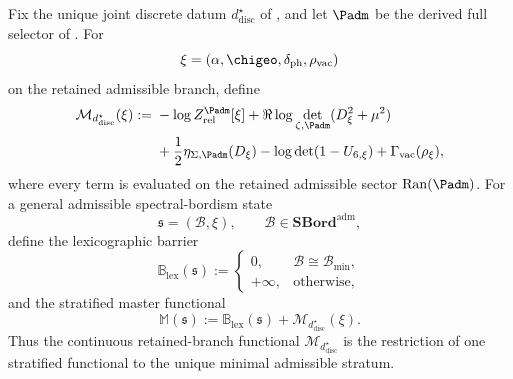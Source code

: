 \begin{definition}
\label{def:projected-modular-free-energy}
Fix the unique joint discrete datum $d^\star_{\mathrm{disc}}$ of
, and let $\Padm$ be the derived full selector of
. For
\[
\xi=(\alpha,\chigeo,\delta_{\mathrm{ph}},\rho_{\mathrm{vac}})
\]
on the retained admissible branch, define
\[
\begin{aligned}
\mathcal M_{d^\star_{\mathrm{disc}}}(\xi)
:={}&-\log Z^{\Padm}_{\mathrm{rel}}[\xi]
+\Re\log\det_{\zeta,\Padm}(D_\xi^2+\mu^2)\\
&+\frac12\eta_{\Sigma,\Padm}(D_\xi)
-\log\det(1-U_{6,\xi})
+\Gamma_{\mathrm{vac}}(\rho_\xi),
\end{aligned}
\]
where every term is evaluated on the retained admissible sector $\operatorname{Ran}(\Padm)$.
For a general admissible spectral-bordism state
\[
\mathfrak s=(\mathcal B,\xi),
\qquad
\mathcal B\in\mathbf{SBord}^{\mathrm{adm}},
\]
define the lexicographic barrier
\[
\mathbb B_{\mathrm{lex}}(\mathfrak s)
:=
\begin{cases}
0,& \mathcal B\cong \mathcal B_{\min},\\
+\infty,& \text{otherwise},
\end{cases}
\]
and the stratified master functional
\[
\mathbb M(\mathfrak s)
:=
\mathbb B_{\mathrm{lex}}(\mathfrak s)+\mathcal M_{d^\star_{\mathrm{disc}}}(\xi).
\]
Thus the continuous retained-branch functional $\mathcal M_{d^\star_{\mathrm{disc}}}$ is the
restriction of one stratified functional to the unique minimal admissible stratum.
\end{definition}
